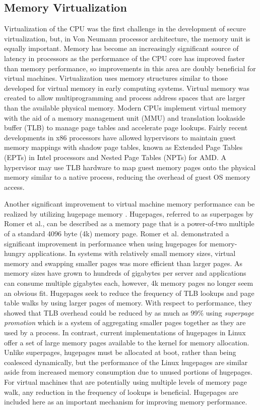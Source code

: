 \subsection{Memory Virtualization}
\label{sec:vt_memory}
Virtualization of the CPU was the first challenge in the development of secure virtualization, but, in Von Neumann processor architecture, the memory unit is equally important.
Memory has become an increasingly significant source of latency in processors as the performance of the CPU core has improved faster than memory performance, so improvements in this area are doubly beneficial for virtual machines.
Virtualization uses memory structures similar to those developed for virtual memory in early computing systems.
Virtual memory was created to allow multiprogramming and process address spaces that are larger than the available physical memory.
Modern CPUs implement virtual memory with the aid of a memory management unit (MMU) and translation lookaside buffer (TLB) to manage page tables and accelerate page lookups.
Fairly recent developments in x86 processors have allowed hypervisors to maintain guest memory mappings with shadow page tables, known as Extended Page Tables (EPTs) in Intel processors and Nested Page Tables (NPTs) for AMD.
A hypervisor may use TLB hardware to map guest memory pages onto the physical memory similar to a native process, reducing the overhead of guest OS memory access.

Another significant improvement to virtual machine memory performance can be realized by utilizing hugepage memory \autocite{_romer_1}.
Hugepages, referred to as superpages by Romer et al., can be described as a memory page that is a power-of-two multiple of a standard 4096 byte (4k) memory page.
Romer et al. demonstrated a significant improvement in performance when using hugepages for memory-hungry applications.
In systems with relatively small memory sizes, virtual memory and swapping smaller pages was more efficient than larger pages.
As memory sizes have grown to hundreds of gigabytes per server and applications can consume multiple gigabytes each, however, 4k memory pages no longer seem an obvious fit.
Hugepages seek to reduce the frequency of TLB lookups and page table walks by using larger pages of memory.
With respect to performance, they showed that TLB overhead could be reduced by as much as 99\% using \emph{superpage promotion} which is a system of aggregating smaller pages together as they are used by a process.
In contrast, current implementations of hugepages in Linux offer a set of large memory pages available to the kernel for memory allocation.
Unlike superpages, hugepages must be allocated at boot, rather than being coalesced dynamically, but the performance of the Linux hugepages are similar aside from increased memory consumption due to unused portions of hugepages.
For virtual machines that are potentially using multiple levels of memory page walk, any reduction in the frequency of lookups is beneficial.
Hugepages are included here as an important mechanism for improving memory performance.

